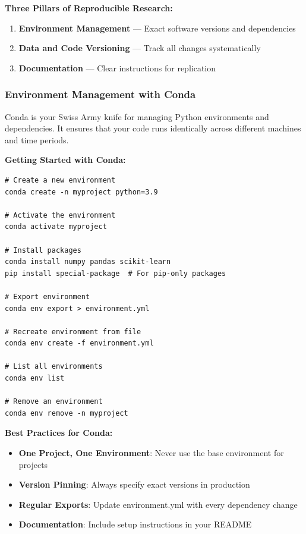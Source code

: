 \documentclass[11pt,a4paper]{article}
\begin{document}
\textbf{Three Pillars of Reproducible Research:}

\begin{enumerate}
    \item \textbf{Environment Management} — Exact software versions and dependencies
    \item \textbf{Data and Code Versioning} — Track all changes systematically
    \item \textbf{Documentation} — Clear instructions for replication
\end{enumerate}

\subsubsection{Environment Management with Conda}

Conda is your Swiss Army knife for managing Python environments and dependencies. It ensures that your code runs identically across different machines and time periods.

\textbf{Getting Started with Conda:}

\begin{tcolorbox}[colback=green!5,colframe=green!50,title={Essential Conda Commands}]
\begin{lstlisting}[style=bashstyle]
# Create a new environment
conda create -n myproject python=3.9

# Activate the environment
conda activate myproject

# Install packages
conda install numpy pandas scikit-learn
pip install special-package  # For pip-only packages

# Export environment
conda env export > environment.yml

# Recreate environment from file
conda env create -f environment.yml

# List all environments
conda env list

# Remove an environment
conda env remove -n myproject
\end{lstlisting}
\end{tcolorbox}

\textbf{Best Practices for Conda:}
\begin{itemize}
    \item \textbf{One Project, One Environment}: Never use the base environment for projects
    \item \textbf{Version Pinning}: Always specify exact versions in production
    \item \textbf{Regular Exports}: Update environment.yml with every dependency change
    \item \textbf{Documentation}: Include setup instructions in your README
\end{itemize}
\end{document}
